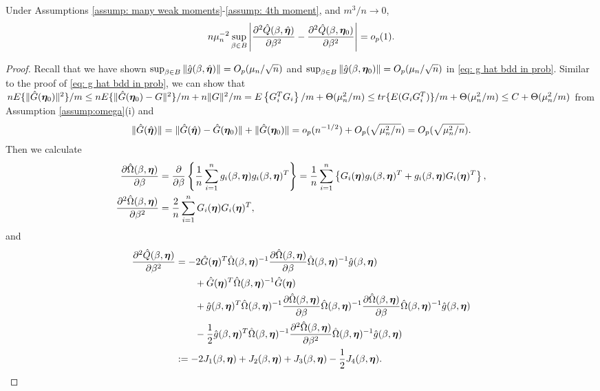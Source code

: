 \documentclass[12pt]{article}
\begin{document}
{\begin{lemma} \label{lemma: Q second deriv} Under Assumptions \ref{assump: many weak moments}-\ref{assump: 4th moment},  and $ m^3/n\rightarrow 0  $, 
\[
 n \mu_n^{-2}  \sup_{\beta\in B}  \left| \frac{\partial^2 \hat Q (\beta, \hat{\bm \eta})}{\partial \beta^2}-   \frac{\partial^2 \hat Q (\beta, \bm \eta_0)}{\partial \beta^2}  \right|  = o_p(1).
\]
\end{lemma}
\begin{proof}
	Recall that we have shown $ \sup_{\beta\in B} \|\hat g(\beta, \hat{\bm \eta})\| = O_p(\mu_n/\sqrt{n})$  and $  \sup_{\beta\in B} \|\hat g(\beta, \bm \eta_0)\| = O_p(\mu_n/\sqrt{n})  $ in \eqref{eq: g hat bdd in prob}. Similar to the proof of \eqref{eq: g hat bdd in prob}, we can show that $ n E\{ \|\hat G(\bm \eta_0) \|^2 
	\}/m \leq n E\{ \|\hat G(\bm \eta_0) - G \|^2 
	\}/m + n \| G \|^2 
/m  = E\left\{G_i^T G_i\right\}/m + \Theta (\mu_n^2/m)\leq tr\{E(G_iG_i^T )\}/m+ \Theta (\mu_n^2/m) \leq C+ \Theta (\mu_n^2/m)$ from Assumption \ref{assump:omega}(i) and  
	\begin{align*}
		\|\hat G(\hat {\bm \eta})\| = \|\hat G(\hat {\bm \eta}) - \hat G(\bm \eta_0) \| + \| \hat G(\bm \eta_0) \| = o_p(n^{-1/2}) + O_p(\sqrt{\mu_n^2/n}) = O_p(\sqrt{\mu_n^2/n}). 
	\end{align*}
	Then we calculate 
	\begin{align*}
		\frac{\partial \hat\Omega(\beta, \bm \eta)}{\partial \beta} &= \frac{\partial }{\partial \beta} \left\{ \frac1n \sum_{i=1}^n g_i(\beta, \bm \eta) g_i(\beta, \bm \eta)^T \right\} = \frac1n \sum_{i=1}^{n} \left\{  G_i(\bm \eta) g_i(\beta, \bm \eta)^T  +g_i(\beta, \bm \eta) G_i(\bm \eta)^T \right\}, \\
		\frac{\partial^2 \hat\Omega(\beta, \bm \eta)}{\partial \beta^2} &=  \frac2n \sum_{i=1}^n G_i( \bm \eta) G_i(\bm \eta)^T,
	\end{align*}
and 
	\begin{align*}
		\frac{\partial^2 \hat Q(\beta, \bm \eta)}{\partial \beta^2} &= -2 \hat G (\bm \eta)^T  \hat \Omega(\beta, \bm \eta)^{-1} \frac{\partial \hat\Omega(\beta, \bm \eta)}{\partial \beta}  \hat \Omega(\beta, \bm \eta)^{-1}\hat g(\beta, \bm \eta) \\
		&\qquad + \hat G(\bm \eta)^T  \hat \Omega(\beta, \bm \eta)^{-1}  \hat G(\bm \eta) \\
		&\qquad+ \hat g(\beta, \bm \eta)^T \hat \Omega(\beta, \bm \eta)^{-1}  \frac{\partial \hat\Omega(\beta, \bm \eta)}{\partial \beta} \hat \Omega(\beta, \bm \eta)^{-1}  \frac{\partial \hat\Omega(\beta, \bm \eta)}{\partial \beta} \hat \Omega(\beta, \bm \eta)^{-1}  \hat g(\beta, \bm \eta) \\
		&\qquad- \frac{1}{2} \hat g(\beta, \bm \eta)^T  \hat \Omega(\beta, \bm \eta)^{-1} \frac{\partial^2 \hat\Omega(\beta, \bm \eta)}{\partial \beta^2} \hat \Omega(\beta, \bm \eta)^{-1}  \hat g(\beta, \bm \eta)\\
		&:= -2 J_1(\beta, \bm \eta) + J_2(\beta, \bm \eta) + J_3(\beta, \bm \eta) -\frac12 J_4(\beta, \bm \eta).
	\end{align*}


\end{proof}}
\end{document}
